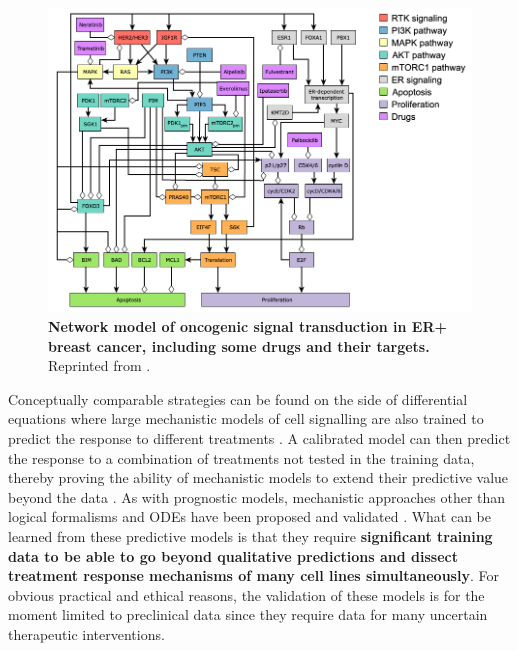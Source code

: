 \documentclass[a4paper,12pt,twoside,onecolumn,openright,final,oldfontcommands]{memoir}
\begin{document}
\begin{figure}

{\centering \includegraphics[width=0.9\linewidth]{fig/netdrug} 

}

\caption[Network model of oncogenic signal transduction in ER+ breast cancer, including some drugs and their targets]{\textbf{Network model of oncogenic signal
transduction in ER+ breast cancer, including some drugs and their
targets.} Reprinted from \citet{zanudo2017network}.}\label{fig:netdrug}
\end{figure}





Conceptually comparable strategies can be found on the side of
differential equations where large mechanistic models of cell signalling
are also trained to predict the response to different treatments
\citep{bouhaddou2018mechanistic, frohlich2018efficient}. A calibrated
model can then predict the response to a combination of treatments not
tested in the training data, thereby proving the ability of mechanistic
models to extend their predictive value beyond the data
\citep{frohlich2018efficient}. As with prognostic models, mechanistic
approaches other than logical formalisms and ODEs have been proposed and
validated \citep{jastrzebski2018integrative}. What can be learned from
these predictive models is that they require \textbf{significant
training data to be able to go beyond qualitative predictions and
dissect treatment response mechanisms of many cell lines
simultaneously}. For obvious practical and ethical reasons, the
validation of these models is for the moment limited to preclinical data
since they require data for many uncertain therapeutic interventions.
\end{document}
